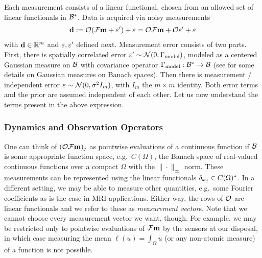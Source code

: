 \documentclass{amsart}
\numberwithin{equation}{section}
\begin{document}
Each measurement consists of a linear functional, chosen from an
allowed set of linear functionals in $\mathcal{B}^{*}$. Data is acquired via
noisy measurements
\begin{align*}
  \mathbf{d} := \mathcal{O} (\mathcal{F} \mathbf{m} + \varepsilon') + \varepsilon = \mathcal{O} \mathcal{F} \mathbf{m} + \mathcal{O} \varepsilon' + \varepsilon
\end{align*}
with $\mathbf{d} \in \mathbb{R}^m$ and $\varepsilon, \varepsilon'$ defined next. Measurement
error consists of two parts. First, there is spatially correlated
error $\varepsilon' \sim \mathcal{N}(0,\Gamma_{\textup{model}})$, modeled as a centered Gaussian
measure on $\mathcal{B}$ with covariance operator $\Gamma_{\textup{model}}: \mathcal{B}^* \to \mathcal{B}$
(see \cite[section 6]{Stuart10} for some details on Gaussian measures
on Banach spaces). Then there is measurement / independent error
$\varepsilon \sim \mathcal{N}(0, \sigma^2 I_m)$, with $I_m$ the $m \times m$
identity. Both error terms and the prior are assumed independent of
each other. Let us now understand the terms present in the above
expression.

\subsubsection{Dynamics and Observation Operators}\label{subsec:dynamics}
One can think of $(\mathcal{O} \mathcal{F} \mathbf{m})_j$ as pointwise evaluations of a
continuous function if $\mathcal{B}$ is some appropriate function space,
e.g.\ $C(\Omega)$, the Banach space of real-valued continuous
functions over a compact $\Omega$ with the $\| \cdot \|_{\infty}$
norm. These measurements can be represented using the linear
functionals $\delta_{{\boldsymbol{x}}_j} \in C(\Omega)^*$. In a different setting,
we may be able to measure other quantities, e.g.\ some Fourier
coefficients as is the case in MRI applications. Either way, the rows
of $\mathcal{O}$ are linear functionals and we refer to these as {\it
  measurement vector}s. Note that we cannot choose every measurement
vector we want, though. For example, we may be restricted only to
pointwise evaluations of $\mathcal{F} \mathbf{m}$ by the sensors at our disposal,
in which case measuring the mean $\ell(u) = \int_{\Omega}u$ (or any
non-atomic measure) of a function is not possible.
\end{document}
